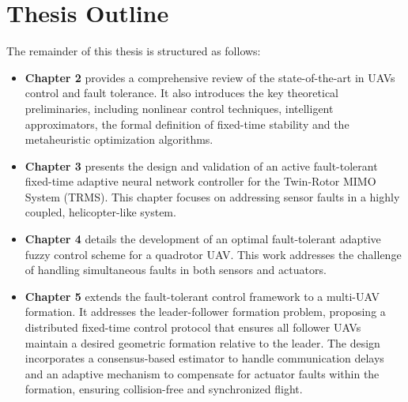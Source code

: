 \section{Thesis Outline}
\label{sec:intro_outline}

The remainder of this thesis is structured as follows:

\begin{itemize}
    \item \textbf{Chapter 2} provides a comprehensive review of the state-of-the-art in UAVs control and fault tolerance. It also introduces the key theoretical preliminaries, including nonlinear control techniques, intelligent approximators, the formal definition of fixed-time stability and the metaheuristic optimization algorithms.
    \item \textbf{Chapter 3} presents the design and validation of an active fault-tolerant fixed-time adaptive neural network controller for the Twin-Rotor MIMO System (TRMS). This chapter focuses on addressing sensor faults in a highly coupled, helicopter-like system.
    \item \textbf{Chapter 4} details the development of an optimal fault-tolerant adaptive fuzzy control scheme for a quadrotor UAV. This work addresses the challenge of handling simultaneous faults in both sensors and actuators.
    \item \textbf{Chapter 5}  extends the fault-tolerant control framework to a multi-UAV formation. It addresses the leader-follower formation problem, proposing a distributed fixed-time control protocol that ensures all follower UAVs maintain a desired geometric formation relative to the leader. The design incorporates a consensus-based estimator to handle communication delays and an adaptive mechanism to compensate for actuator faults within the formation, ensuring collision-free and synchronized flight. 
        
       
\end{itemize}

%

